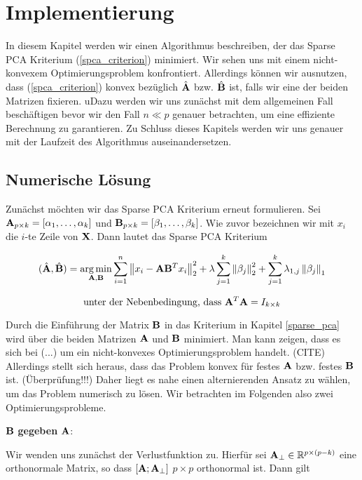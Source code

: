 \chapter{Implementierung}

\label{implementation}

In diesem Kapitel werden wir einen Algorithmus beschreiben, der das Sparse PCA Kriterium (\ref{spca_criterion}) minimiert. Wir sehen uns mit einem nicht-konvexem Optimierungsproblem konfrontiert. Allerdings können wir ausnutzen, dass (\ref{spca_criterion}) konvex bezüglich $\hat{\mathbf{A}}$ bzw. $\hat{\mathbf{B}}$ ist, falls wir eine der beiden Matrizen fixieren. uDazu werden wir uns zunächst mit dem allgemeinen Fall beschäftigen bevor wir den Fall $n \ll p$ genauer betrachten, um eine effiziente Berechnung zu garantieren. Zu Schluss dieses Kapitels werden wir uns genauer mit der Laufzeit des Algorithmus auseinandersetzen. 

\section{Numerische Lösung}
\label{spca_numerical_solution}

Zunächst möchten wir das Sparse PCA Kriterium erneut formulieren. Sei $\mathbf{A}_{p \times k} = [ \alpha_1, \ldots ,\alpha_k ]$ und $\mathbf{B}_{p \times k} = [ \beta_1, \ldots ,\beta_k ]$. Wie zuvor bezeichnen wir mit $x_i$ die $i$-te Zeile von $\mathbf{X}$. Dann lautet das Sparse PCA Kriterium

$$(\hat{\mathbf{A}}, \hat{\mathbf{B}}) = \operatorname*{arg\,min}_{\mathbf{A}, \mathbf{B}} \sum_{i=1}^{n} \left\lVert x_i - \mathbf{A}\mathbf{B}^Tx_i \right\rVert_2^2 + \lambda \sum_{j=1}^{k}\left\lVert \beta_j \right\rVert_2^2 + \sum_{j=1}^k \lambda_{1,j} \left\lVert \beta_j \right\rVert_1$$

$$\text{unter der Nebenbedingung, dass } \mathbf{A}^T\mathbf{A} = I_{k \times k}$$

Durch die Einführung der Matrix $\mathbf{B}$ in das Kriterium in Kapitel \ref{sparse_pca} wird über die beiden Matrizen $\mathbf{A}$ und $\mathbf{B}$ minimiert. Man kann zeigen, dass es sich bei (...) um ein nicht-konvexes Optimierungsproblem handelt. (CITE) Allerdings stellt sich heraus, dass das Problem konvex für festes $\mathbf{A}$ bzw. festes $\mathbf{B}$ ist. (Überprüfung!!!) Daher liegt es nahe einen alternierenden Ansatz zu wählen, um das Problem numerisch zu lösen. Wir betrachten im Folgenden also zwei Optimierungsprobleme.

$\mathbf{B}$ \textbf{gegeben} $\mathbf{A}$:

Wir wenden uns zunächst der Verlustfunktion zu. Hierfür sei $\mathbf{A}_{\perp} \in \mathbb{R}^{p \times (p-k)}$ eine orthonormale Matrix, so dass $[\mathbf{A} ; \mathbf{A}_{\perp}]$ $p \times p$ orthonormal ist. Dann gilt

